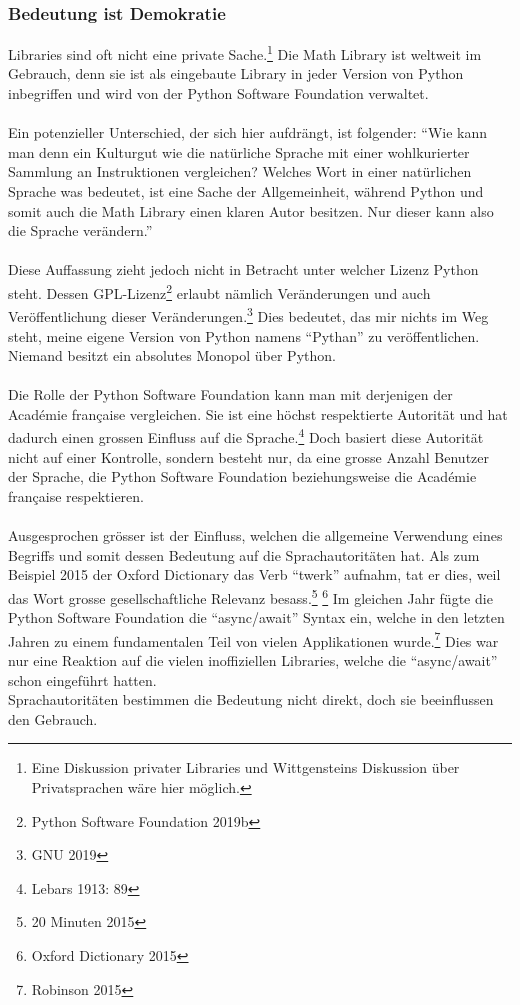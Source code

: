 \documentclass[10pt,a4paper]{article}
\begin{document}
\subsubsection{Bedeutung ist Demokratie}
Libraries sind oft nicht eine private Sache.\footnote{Eine Diskussion privater Libraries und Wittgensteins Diskussion über Privatsprachen wäre hier möglich.} Die Math Library ist weltweit im Gebrauch, denn sie ist als eingebaute Library in jeder Version von Python inbegriffen und wird von der Python Software Foundation verwaltet. \\
\\
Ein potenzieller Unterschied, der sich hier aufdrängt, ist folgender: \enquote{Wie kann man denn ein Kulturgut wie die natürliche Sprache mit einer wohlkurierter Sammlung an Instruktionen vergleichen? Welches Wort in einer natürlichen Sprache was bedeutet, ist eine Sache der Allgemeinheit, während Python und somit auch die Math Library einen klaren Autor besitzen. Nur dieser kann also die Sprache verändern.} \\
\\
Diese Auffassung zieht jedoch nicht in Betracht unter welcher Lizenz Python steht. Dessen GPL-Lizenz\footnote{Python Software Foundation 2019b} erlaubt nämlich Veränderungen und auch Veröffentlichung dieser Veränderungen.\footnote{GNU 2019} Dies bedeutet, das mir nichts im Weg steht, meine eigene Version von Python namens \enquote{Pythan} zu veröffentlichen. Niemand besitzt ein absolutes Monopol über Python. \\
\\
Die Rolle der Python Software Foundation kann man mit derjenigen der Académie française vergleichen. Sie ist eine höchst respektierte Autorität und hat dadurch einen grossen Einfluss auf die Sprache.\footnote{Lebars 1913: 89} Doch basiert diese Autorität nicht auf einer Kontrolle, sondern besteht nur, da eine grosse Anzahl Benutzer der Sprache, die Python Software Foundation beziehungsweise die Académie française respektieren. \\
\\
Ausgesprochen grösser ist der Einfluss, welchen die allgemeine Verwendung eines Begriffs und somit dessen Bedeutung auf die Sprachautoritäten hat. Als zum Beispiel 2015 der Oxford Dictionary das Verb \enquote{twerk} aufnahm, tat er dies, weil das Wort grosse gesellschaftliche Relevanz besass.\footnote{20 Minuten 2015} \footnote{Oxford Dictionary 2015} Im gleichen Jahr fügte die Python Software Foundation die \enquote{async/await} Syntax ein, welche in den letzten Jahren zu einem fundamentalen Teil von vielen Applikationen wurde.\footnote{Robinson 2015} Dies war nur eine Reaktion auf die vielen inoffiziellen Libraries, welche die \enquote{async/await} schon eingeführt hatten. \\
Sprachautoritäten bestimmen die Bedeutung nicht direkt, doch sie beeinflussen den Gebrauch.
\end{document}

